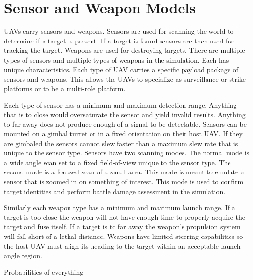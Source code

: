 \chapter{Sensor and Weapon Models}
UAVs carry sensors and weapons.  Sensors are used for scanning the world to determine if a target is present.  If a target is found sensors are then used for tracking the target.  Weapons are used for destroying targets.  There are multiple types of sensors and multiple types of weapons in the simulation.  Each has unique characteristics.  Each type of UAV carries a specific payload package of sensors and weapons.  This allows the UAVs to specialize as surveillance or strike platforms or to be a multi-role platform.

Each type of sensor has a minimum and maximum detection range.  Anything that is to close would oversaturate the sensor and yield invalid results.  Anything to far away does not produce enough of a signal to be detectable.  Sensors can be mounted on a gimbal turret or in a fixed orientation on their host UAV.  If they are gimbaled the sensors cannot slew faster than a maximum slew rate that is unique to the sensor type.  Sensors have two scanning modes.  The normal mode is a wide angle scan set to a fixed field-of-view unique to the sensor type.  The second mode is a focused scan of a small area.  This mode is meant to emulate a sensor that is zoomed in on something of interest.  This mode is used to confirm target identities and perform battle damage assessment in the simulation.

Similarly each weapon type has a minimum and maximum launch range.  If a target is too close the weapon will not have enough time to properly acquire the target and fuse itself.   If a target is to far away the weapon's propulsion system will fall short of a lethal distance.  Weapons have limited steering capabilities so the host UAV must align its heading to the target within an acceptable launch angle region.

Probabilities of everything

